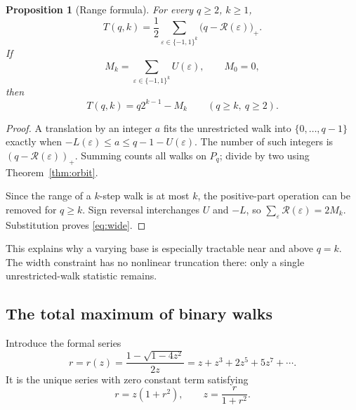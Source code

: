 \documentclass[11pt,letterpaper]{article}
\numberwithin{equation}{section}
\newtheorem{proposition}[theorem]{Proposition}
\theoremstyle{definition}
\begin{document}
\begin{proposition}[Range formula]\label{prop:range}
For every $q\ge2$, $k\ge1$,
\begin{equation}\label{eq:range}
T(q,k)=\frac12\sum_{\varepsilon\in\{-1,1\}^k}
\bigl(q-\mathcal R(\varepsilon)\bigr)_+.
\end{equation}
If
\begin{equation}\label{eq:Mdef}
M_k=\sum_{\varepsilon\in\{-1,1\}^k}U(\varepsilon),\qquad M_0=0,
\end{equation}
then
\begin{equation}\label{eq:wide}
T(q,k)=q2^{k-1}-M_k\qquad(q\ge k,\ q\ge2).
\end{equation}
\end{proposition}
\begin{proof}
A translation by an integer $a$ fits the unrestricted walk into
$\{0,\ldots,q-1\}$ exactly when
$-L(\varepsilon)\le a\le q-1-U(\varepsilon)$.
The number of such integers is $(q-\mathcal R(\varepsilon))_+$.
Summing counts all walks on $P_q$; divide by two using
Theorem~\ref{thm:orbit}.

Since the range of a $k$-step walk is at most $k$, the positive-part
operation can be removed for $q\ge k$.  Sign reversal interchanges $U$
and $-L$, so $\sum_\varepsilon\mathcal R(\varepsilon)=2M_k$.
Substitution proves \eqref{eq:wide}.
\end{proof}

This explains why a varying base is especially tractable near and above
$q=k$.  The width constraint has no nonlinear truncation there: only a
single unrestricted-walk statistic remains.

\subsection{The total maximum of binary walks}
Introduce the formal series
\begin{equation}\label{eq:r}
r=r(z)=\frac{1-\sqrt{1-4z^2}}{2z}
=z+z^3+2z^5+5z^7+\cdots.
\end{equation}
It is the unique series with zero constant term satisfying
\begin{equation}\label{eq:rparam}
r=z(1+r^2),\qquad z=\frac r{1+r^2}.
\end{equation}
\end{document}
